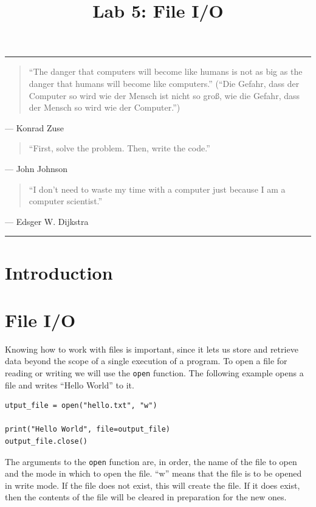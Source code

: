 \documentclass[11pt]{cselabheader}
\title{Lab 5: File I/O}
\begin{document}
\maketitle

\hrule
\begin{quotation}
``The danger that computers will become like humans is not as big as the danger
that humans will become like computers.'' (``Die Gefahr, dass der Computer so
wird wie der Mensch ist nicht so gro\ss, wie die Gefahr, dass der Mensch so wird
wie der Computer.'')
\end{quotation}
\begin{flushright}
--- Konrad Zuse
\end{flushright}

\begin{quotation}
	``First, solve the problem. Then, write the code.''
\end{quotation}
\begin{flushright}
	--- John Johnson
\end{flushright}

\begin{quotation}
``I don’t need to waste my time with a computer just because I am a computer
scientist.''
\end{quotation}
\begin{flushright}
--- Edsger W. Dijkstra
\end{flushright}

\hrule

\section{Introduction}


\section{File I/O}
Knowing how to work with files is important, since it lets us store and retrieve data beyond the scope of a single execution of a program. To open a file for reading or writing we will use the \lstinline{open} function. The following example opens a file and writes ``Hello World'' to it.

\begin{lstlisting}[style=python]
 utput_file = open("hello.txt", "w")

print("Hello World", file=output_file)
output_file.close()
\end{lstlisting}

The arguments to the \lstinline{open} function are, in order, the name of the file to open and the mode in which to open the file. ``w'' means that the file is to be opened in write mode. If the file does not exist, this will create the file. If it does exist, then the contents of the file will be cleared in preparation for the new ones.
\end{document}
